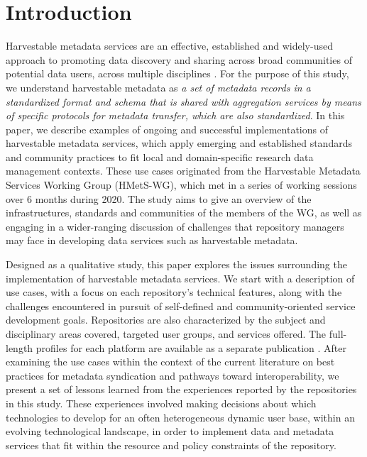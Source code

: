 \documentclass{interact}
\begin{document}
\section{Introduction}\label{intro}
Harvestable metadata services are an effective, established and widely-used approach to promoting data discovery and sharing across broad communities of potential data users, across multiple disciplines \parencite{lokers_analysis_2016, valentine_earthcube_2020}. For the purpose of this study, we understand harvestable metadata as \emph{a set of metadata records in a standardized format and schema that is shared with aggregation services by means of specific protocols for metadata transfer, which are also standardized}. In this paper, we describe examples of ongoing and successful implementations of harvestable metadata services, which apply emerging and established standards and community practices to fit local and domain-specific research data management contexts. These use cases originated from the Harvestable Metadata Services Working Group (HMetS-WG), which met in a series of working sessions over 6 months during 2020. The study aims to give an overview of the infrastructures, standards and communities of the members of the WG, as well as engaging in a wider-ranging discussion of challenges that repository managers may face in developing data services such as harvestable metadata.

Designed as a qualitative study, this paper explores the issues surrounding the implementation of harvestable metadata services. We start with a description of use cases, with a focus on each repository's technical features, along with the challenges encountered in pursuit of self-defined and community-oriented service development goals. Repositories are also characterized by the subject and disciplinary areas covered, targeted user groups, and services offered. The full-length profiles for each platform are available as a separate publication \parencite{urquidi_diaz_harvestable_2022}. After examining the use cases within the context of the current literature on best practices for metadata syndication and pathways toward interoperability, we present a set of lessons learned from the experiences reported by the repositories in this study. These experiences involved making decisions about which technologies to develop for an often heterogeneous dynamic user base, within an evolving technological landscape, in order to implement data and metadata services that fit within the resource and policy constraints of the repository.
\end{document}
